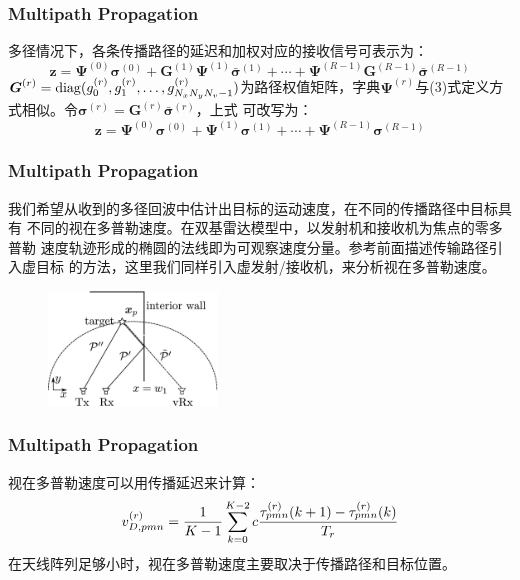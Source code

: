 \documentclass[cjk]{beamer}
\begin{document}
  \begin{frame}
	\frametitle{Multipath Propagation}
	多径情况下，各条传播路径的延迟和加权对应的接收信号可表示为：
	\begin{equation*}
	  {\boldsymbol z}={\boldsymbol\Psi}^{(0)}{\boldsymbol\sigma}^{(0)}+{\boldsymbol G}^{(1)}{\boldsymbol\Psi}^{(1)}\bar{\boldsymbol\sigma}^{(1)}+\cdots+{\boldsymbol\Psi}^{(R-1)}{\boldsymbol G}^{(R-1)}\bar{\boldsymbol\sigma}^{(R-1)}
	\end{equation*}
	${\boldsymbol G}^{(r)}={\rm diag}(g_{0}^{(r)}, g_{1}^{(r)},\ldots, g_{N_{x}N_{y}N_{v}-1}^{(r)})$为路径权值矩阵，字典${\boldsymbol\Psi}^{(r)}$与(3)式定义方式相似。令${\boldsymbol\sigma}^{(r)}={\boldsymbol G}^{(r)}\bar{\boldsymbol\sigma}^{(r)}$，上式
	可改写为：
	\begin{equation}
	 {\boldsymbol z}={\boldsymbol\Psi}^{(0)}{\boldsymbol\sigma}^{(0)}+{\boldsymbol\Psi}^{(1)}{\boldsymbol\sigma}^{(1)}+\cdots+{\boldsymbol\Psi}^{(R-1)}{\boldsymbol\sigma}^{(R-1)} 
	\end{equation}
  \end{frame}
  \begin{frame}
	\frametitle{Multipath Propagation}
	我们希望从收到的多径回波中估计出目标的运动速度，在不同的传播路径中目标具有
	不同的视在多普勒速度。在双基雷达模型中，以发射机和接收机为焦点的零多普勒
	速度轨迹形成的椭圆的法线即为可观察速度分量。参考前面描述传输路径引入虚目标
	的方法，这里我们同样引入虚发射/接收机，来分析视在多普勒速度。
	\begin{figure}
	  \centering
	  \includegraphics[width=0.4\textwidth]{fig3.jpg}
	\end{figure}
  \end{frame}
  \begin{frame}
	\frametitle{Multipath Propagation}
	视在多普勒速度可以用传播延迟来计算：
	\begin{equation}
	  v_{D, pmn}^{(r)}={1\over K-1}\sum_{k=0}^{K-2}c{\tau_{pmn}^{(r)}(k+1)-\tau_{pmn}^{(r)}(k)\over T_{r}}
	\end{equation}
	在天线阵列足够小时，视在多普勒速度主要取决于传播路径和目标位置。
  \end{frame}
\end{document}
